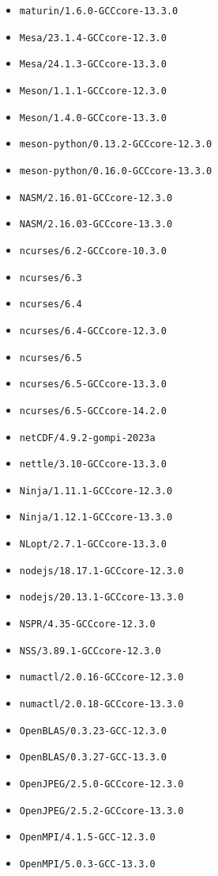 \begin{multicols}{3}
\begin{itemize}
\item \verb|maturin/1.6.0-GCCcore-13.3.0|
\item \verb|Mesa/23.1.4-GCCcore-12.3.0|
\item \verb|Mesa/24.1.3-GCCcore-13.3.0|
\item \verb|Meson/1.1.1-GCCcore-12.3.0|
\item \verb|Meson/1.4.0-GCCcore-13.3.0|
\item \verb|meson-python/0.13.2-GCCcore-12.3.0|
\item \verb|meson-python/0.16.0-GCCcore-13.3.0|
\item \verb|NASM/2.16.01-GCCcore-12.3.0|
\item \verb|NASM/2.16.03-GCCcore-13.3.0|
\item \verb|ncurses/6.2-GCCcore-10.3.0|
\item \verb|ncurses/6.3|
\item \verb|ncurses/6.4|
\item \verb|ncurses/6.4-GCCcore-12.3.0|
\item \verb|ncurses/6.5|
\item \verb|ncurses/6.5-GCCcore-13.3.0|
\item \verb|ncurses/6.5-GCCcore-14.2.0|
\item \verb|netCDF/4.9.2-gompi-2023a|
\item \verb|nettle/3.10-GCCcore-13.3.0|
\item \verb|Ninja/1.11.1-GCCcore-12.3.0|
\item \verb|Ninja/1.12.1-GCCcore-13.3.0|
\item \verb|NLopt/2.7.1-GCCcore-13.3.0|
\item \verb|nodejs/18.17.1-GCCcore-12.3.0|
\item \verb|nodejs/20.13.1-GCCcore-13.3.0|
\item \verb|NSPR/4.35-GCCcore-12.3.0|
\item \verb|NSS/3.89.1-GCCcore-12.3.0|
\item \verb|numactl/2.0.16-GCCcore-12.3.0|
\item \verb|numactl/2.0.18-GCCcore-13.3.0|
\item \verb|OpenBLAS/0.3.23-GCC-12.3.0|
\item \verb|OpenBLAS/0.3.27-GCC-13.3.0|
\item \verb|OpenJPEG/2.5.0-GCCcore-12.3.0|
\item \verb|OpenJPEG/2.5.2-GCCcore-13.3.0|
\item \verb|OpenMPI/4.1.5-GCC-12.3.0|
\item \verb|OpenMPI/5.0.3-GCC-13.3.0|

\end{itemize}
\end{multicols}
